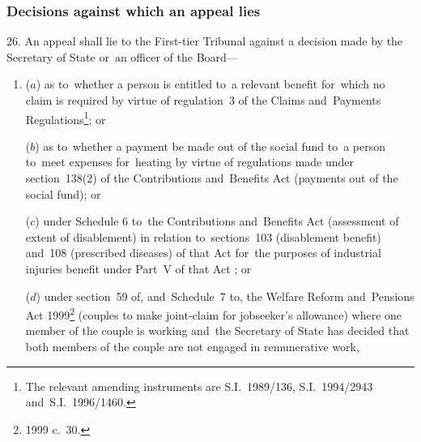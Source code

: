 \documentclass[12pt,a4paper]{article}
\begin{document}

\subsubsection[26. Decisions against which an appeal lies]{Decisions against which an appeal lies}

26.  An appeal shall lie to
the First-tier Tribunal  %
against a decision made by the Secretary of State
or~an officer of the Board—  %
\begin{enumerate}\item[]
($a$) as to~whether a person is entitled to~a relevant benefit for~which no claim is required by virtue of regulation~3 of the Claims and~Payments Regulations\footnote{\frenchspacing The relevant amending instruments are S.I.~1989/136, S.I.~1994/2943 and~S.I.~1996/1460.}; or

($b$) as to~whether a payment be made out of the social fund to~a person to~meet expenses for~heating by virtue of regulations made under section~138(2) of the Contributions and~Benefits Act (payments out of the social fund);
or

($c$) under Schedule 6 to~the Contributions and~Benefits Act (assessment of extent of disablement) in relation to~sections~103 (disablement benefit) and~108 (prescribed diseases) of that Act for~the purposes of industrial injuries benefit under Part~V of that Act%
; or

    ($d$) 
    under section~59 of, and~Schedule~7 to, the Welfare Reform and~Pensions Act 1999\footnote{1999 c.~30.} (couples to make joint-claim for jobseeker’s allowance) where one member of the couple is working and~the Secretary of State has decided that both members of the couple are not engaged in remunerative work,
\end{enumerate}
\end{document}
